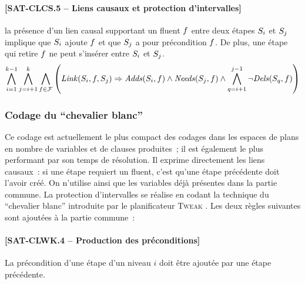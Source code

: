 {\paragraph*{[SAT-CLCS.5 -- Liens causaux et protection d'intervalles]} la présence d'un lien
  causal supportant un fluent $f$ entre deux étapes $S_{i}$ et $S_{j}$
  implique que $S_{i}$ ajoute $f$ et que $S_{j}$ a pour précondition
  $f$. De plus, une étape qui retire $f$ ne peut s'insérer entre $S_{i}$ et $S_{j}$.
\[
\BigforallTwo{i=1}{k-1} \BigforallTwo{j=i+1}{k} \Bigforall{\f\in \F} \left( %
  \Linksteps{i}{\f}{j} \Rightarrow \Adds{i}{\f} \land \Needs{j}{\f} \land %
  \BigforallTwo{q=i+1}{j-1} \lnot \Dels{q}{\f}%
  \right)
\]

\subsubsection{Codage du \enquote{chevalier blanc}}

Ce codage est actuellement le plus compact des codages dans les espaces de plans
en nombre de variables et de clauses produites~; il est également le plus
performant par son temps de résolution. Il exprime directement les liens
causaux~: si une étape requiert un fluent, c'est qu'une étape précédente doit
l'avoir créé. On n'utilise ainsi que les variables déjà présentes dans la partie
commune. La protection d'intervalles se réalise en codant la technique du
\enquote{chevalier blanc} introduite par le planificateur \textsc{Tweak}
\cite{Cha87}. Les deux règles suivantes sont ajoutées à la partie commune~:


\paragraph*{[SAT-CLWK.4 -- Production des préconditions]} La précondition d'une étape d'un niveau
  $i$ doit être ajoutée par une étape précédente.

}
